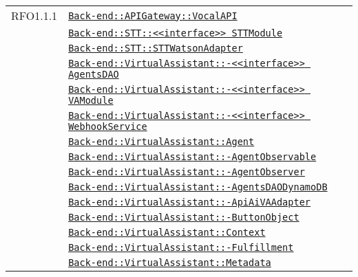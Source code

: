 \begin{longtable}{|>{\centering}m{3cm}|m{10cm}<{\centering}|}
RFO1.1.1 & \hyperref[Back-end::APIGateway::VocalAPI]{\texttt{Back-end::APIGateway::VocalAPI}}\\
& \hyperref[Back-end::STT::<<interface>> STTModule]{\texttt{Back-end::STT::<<interface>> STTModule}}\\
& \hyperref[Back-end::STT::STTWatsonAdapter]{\texttt{Back-end::STT::STTWatsonAdapter}}\\
& \hyperref[Back-end::VirtualAssistant::<<interface>> AgentsDAO]{\texttt{Back-end::VirtualAssistant::-\linebreak <<interface>> AgentsDAO}}\\
& \hyperref[Back-end::VirtualAssistant::<<interface>> VAModule]{\texttt{Back-end::VirtualAssistant::-\linebreak <<interface>> VAModule}}\\
& \hyperref[Back-end::VirtualAssistant::<<interface>> WebhookService]{\texttt{Back-end::VirtualAssistant::-\linebreak <<interface>> WebhookService}}\\
& \hyperref[Back-end::VirtualAssistant::Agent]{\texttt{Back-end::VirtualAssistant::Agent}}\\
& \hyperref[Back-end::VirtualAssistant::AgentObservable]{\texttt{Back-end::VirtualAssistant::-\linebreak AgentObservable}}\\
& \hyperref[Back-end::VirtualAssistant::AgentObserver]{\texttt{Back-end::VirtualAssistant::-\linebreak AgentObserver}}\\
& \hyperref[Back-end::VirtualAssistant::AgentsDAODynamoDB]{\texttt{Back-end::VirtualAssistant::-\linebreak AgentsDAODynamoDB}}\\
& \hyperref[Back-end::VirtualAssistant::ApiAiVAAdapter]{\texttt{Back-end::VirtualAssistant::-\linebreak ApiAiVAAdapter}}\\
& \hyperref[Back-end::VirtualAssistant::ButtonObject]{\texttt{Back-end::VirtualAssistant::-\linebreak ButtonObject}}\\
& \hyperref[Back-end::VirtualAssistant::Context]{\texttt{Back-end::VirtualAssistant::Context}}\\
& \hyperref[Back-end::VirtualAssistant::Fulfillment]{\texttt{Back-end::VirtualAssistant::-\linebreak Fulfillment}}\\
& \hyperref[Back-end::VirtualAssistant::Metadata]{\texttt{Back-end::VirtualAssistant::Metadata}}\\

\end{longtable}
